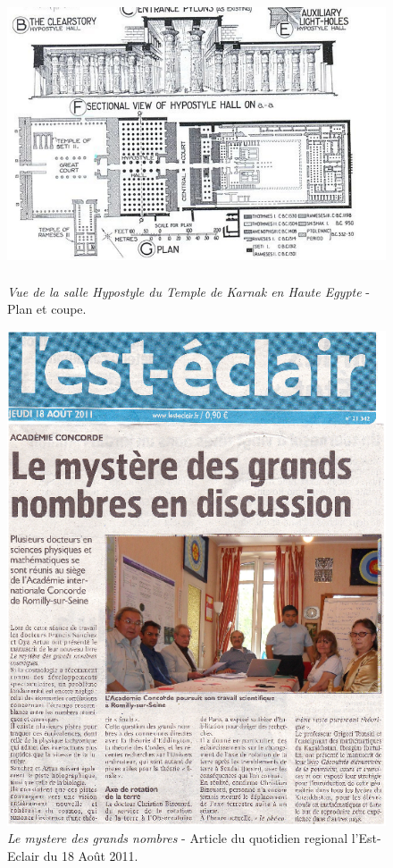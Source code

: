 \documentclass[a4paper,12pt]{article}
\begin{document}
\begin{appendix}
\begin{figure}
\centering
\includegraphics[width=14.5cm,height=8.6cm]{./figures/karnak.png}
\caption [Plan du Temple de Karnak]{\textit{Vue de la salle Hypostyle du Temple de Karnak en Haute Egypte} - Plan et coupe.} 
\label{fig:4:figure4}
\end{figure}

\begin{figure}
\centering
\includegraphics{./figures/lesteclair.png}
\caption [L'est-Eclair: Le mystere des grands nombres]{\textit{Le mystere des grands nombres} - Article du quotidien regional l'Est-Eclair du 18 Ao\^ut 2011.} 
\label{fig:5:figure5}
\end{figure}


\end{appendix}
\end{document}
